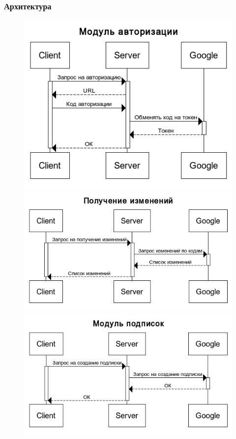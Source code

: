 \documentclass[10pt,pdf,hyperref={unicode}]{beamer}
\begin{document}
    \begin{frame}\frametitle{Архитектура}
    	\begin{figure}[ht] 
            \begin{minipage}[b]{0.5\linewidth}
                \centering
                \includegraphics[scale=0.25]{auth.png} 
            \end{minipage}%
            \begin{minipage}[b]{0.5\linewidth}
                \centering
	            \includegraphics[scale=0.25]{changes.png} 
            \end{minipage}
            \begin{minipage}[b]{0.5\linewidth}
    	        \centering
                \includegraphics[scale=0.25]{subscription.png} 

\end{minipage}
\end{figure}
\end{frame}
\end{document}
